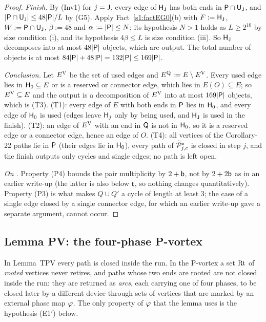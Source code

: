 \begin{proof}
\emph{Finish.} By (Inv1) for $j=\mathsf{J}$, every edge of $\mathsf{H}_{\mathsf{J}}$ has both ends in $\mathsf{P}\cap\mathsf{U}_{\mathsf{J}}$, and
$|\mathsf{P}\cap\mathsf{U}_{\mathsf{J}}|\le48|\mathsf{P}|/L$ by (G5). Apply Fact~\ref{s1:factEG0}(b) with $F:=\mathsf{H}_{\mathsf{J}}$, $W:=\mathsf{P}\cap\mathsf{U}_{\mathsf{J}}$,
$\beta:=48$ and $\alpha:=|\mathsf{P}|\le N$; its hypothesis $N>1$ holds as $L\ge2^{10}$ by size condition (i), and its hypothesis $4\beta\le L$ is size
condition (iii). So $\mathsf{H}_{\mathsf{J}}$ decomposes into at most
$48|\mathsf{P}|$ objects, which are output. The total number of objects is at most $84|\mathsf{P}|+48|\mathsf{P}|=132|\mathsf{P}|\le169|\mathsf{P}|$.

\emph{Conclusion.} Let $E^{\mathrm{V}}$ be the set of used edges and $E^{\mathrm{Q}}:=E\setminus E^{\mathrm{V}}$. Every used edge lies in $\mathsf{H}_0\subseteq
E$ or is a reserved or connector edge, which lies in $E(O)\subseteq E$; so $E^{\mathrm{V}}\subseteq E$ and the output is a
decomposition of $E^{\mathrm{V}}$ into at most $169|\mathsf{P}|$ objects, which is (T3).
(T1): every edge of $E$ with both ends in $\mathsf{P}$ lies in $\mathsf{H}_0$, and every edge of $\mathsf{H}_0$ is used (edges leave
$\mathsf{H}_j$ only by being used, and $\mathsf{H}_{\mathsf{J}}$ is used in the finish).
(T2): an edge of $E^{\mathrm{V}}$ with an end in $\mathsf{Q}$ is not in $\mathsf{H}_0$, so it is a reserved edge or a connector edge, hence an
edge of $O$.
(T4): all vertices of the Corollary-22 paths lie in $\mathsf{P}$ (their edges lie in $\mathsf{H}_0$), every path of
$\widetilde{\mathcal{P}}^{\mathsf{v}}_{j,c}$ is closed in step $j$, and the finish outputs only cycles and single edges; no path is left open.

\emph{On .} Property (P4) bounds the pair multiplicity by $2+\mathsf{b}$, not by $2+2\mathsf{b}$ as in an earlier
write-up (the latter is also below $\mathsf{t}$, so nothing changes quantitatively). Property (P3) is what makes
$Q\cup Q'$ a cycle of length at least $3$; the case of a single edge closed by a single connector edge, for which an
earlier write-up gave a separate argument, cannot occur.
\end{proof}


\subsection{Lemma PV: the four-phase P-vortex}\label{s4:ssecPV}

In Lemma~TPV every path is closed inside the run. In the P-vortex a set $\mathrm{Rt}$ of \emph{rooted} vertices never
retires, and paths whose two ends are rooted are not closed inside the run: they are returned as \emph{arcs}, each
carrying one of four phases, to be closed later by a different device through sets of vertices that are marked by an
external phase map $\varphi$. The only property of $\varphi$ that the lemma uses is the hypothesis (E1$'$) below.

